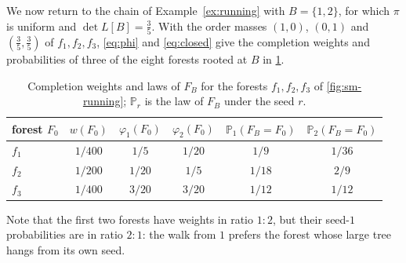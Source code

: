\documentclass[onefignum,onetabnum]{siamart250211}
\numberwithin{theorem}{section}
\numberwithin{equation}{section}
\newcommand{\pr}{\mathbb{P}}
\begin{document}
\begin{example}\label{ex:stopped}
We now return to the chain of Example~\ref{ex:running} with $B=\{1,2\}$, for
which $\pi$ is uniform and $\det L[B]=\tfrac35$. With the order masses
$(1,0)$, $(0,1)$ and $(\tfrac35,\tfrac35)$ of $f_1,f_2,f_3$,
\eqref{eq:phi} and \eqref{eq:closed} give the completion weights and
probabilities of three of the eight forests rooted at $B$ in
\cref{tab:completion}.

\begin{table}[ht]
    \caption{Completion weights and laws of $F_B$ for the forests
    $f_1,f_2,f_3$ of \cref{fig:sm-running}; $\pr_r$ is the law of $F_B$
    under the seed $r$.}\label{tab:completion}
    \centering
    \small
    \begin{tabular}{@{}lccccc@{}}
        \toprule
        forest $F_0$ & $w(F_0)$ & $\varphi_1(F_0)$ & $\varphi_2(F_0)$ & $\pr_1(F_B=F_0)$ & $\pr_2(F_B=F_0)$ \\
        \midrule
        $f_1$ & $1/400$ & $1/5$ & $1/20$ & $1/9$ & $1/36$ \\
        $f_2$ & $1/200$ & $1/20$ & $1/5$ & $1/18$ & $2/9$ \\
        $f_3$ & $1/400$ & $3/20$ & $3/20$ & $1/12$ & $1/12$ \\
        \bottomrule
    \end{tabular}
\end{table}
\smallskip
Note that
the first two forests have weights in ratio $1{:}2$, but their seed-$1$
probabilities are in ratio $2{:}1$: the walk from $1$ prefers the forest
whose large tree hangs from its own seed. 
\end{example}
\end{document}
